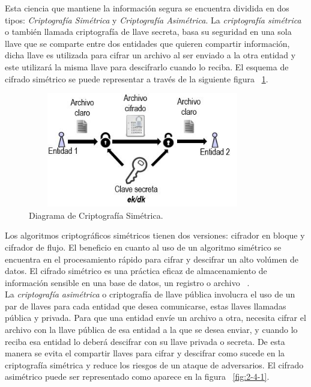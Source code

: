 Esta ciencia que mantiene la información segura se encuentra dividida en dos tipos: \textit{Criptografía Simétrica} y \textit{Criptografía Asimétrica}. La \textit{ criptografía simétrica} o también llamada criptografía de llave secreta, basa su seguridad en una sola llave que se comparte entre dos entidades que quieren compartir información, dicha llave es utilizada para cifrar un archivo al ser enviado a la otra entidad y este utilizará la misma llave para descifrarlo cuando lo reciba. El esquema de cifrado simétrico se puede representar a través de la siguiente figura ~\ref{fig:2-3-1}. \\

\begin{figure}[H]
\centering
\includegraphics[width=10cm, height=5cm]{./images/Cripto_Simetrica.JPG}
\caption{Diagrama de Criptografía Simétrica.}
\label{fig:2-3-1}
\end{figure}

Los algoritmos criptográficos simétricos tienen dos versiones: cifrador en bloque y cifrador de flujo. El beneficio en cuanto al uso de un algoritmo simétrico se encuentra en el procesamiento rápido para cifrar y descifrar un alto volúmen de datos. El cifrado simétrico es una práctica eficaz de almacenamiento de información sensible en una base de datos, un registro o archivo ~\cite{sime}. \\

La \textit{ criptografía asimétrica} o criptografía de llave pública involucra el uso de un par de llaves para cada entidad que desea comunicarse, estas llaves llamadas pública y privada. Para que una entidad envíe un archivo a otra, necesita cifrar el archivo con la llave pública de esa entidad a la que se desea enviar, y cuando lo reciba esa entidad lo deberá descifrar con su llave privada o secreta. De esta manera se evita el compartir llaves para cifrar y descifrar como sucede en la criptografía simétrica y reduce los riesgos de un ataque de adversarios. El cifrado asimétrico puede ser representado como aparece en la figura ~\ref{fig:2-4-1}. \\

